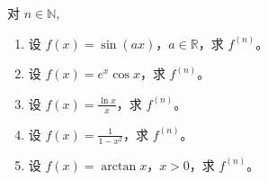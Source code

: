 \documentclass[../../main.tex]{subfiles}%
\begin{document}
\begin{example}
对 \( n \in \mathbb{N} \),
\begin{enumerate}[(1)]
\item 设 \( f(x) = \sin(ax) \)，\( a \in \mathbb{R} \)，求 \( f^{(n)} \)。

\item 设 \( f(x) = e^x \cos x \)，求 \( f^{(n)} \)。

\item 设 \( f(x) = \frac{\ln x}{x} \)，求 \( f^{(n)} \)。

\item 设 \( f(x) = \frac{1}{1 - x^2} \)，求 \( f^{(n)} \)。

\item 设 \( f(x) = \arctan x \)，\( x > 0 \)，求 \( f^{(n)} \)。
\end{enumerate}
\end{example}
\end{document}
